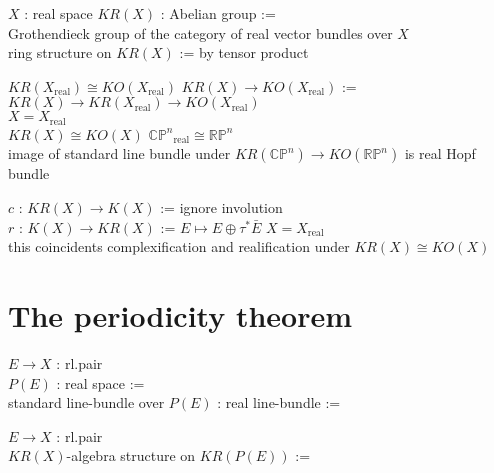 \documentclass[dvipdfmx]{jsarticle}
\begin{document}
\begin{Definition}
\itemwhen
  \For \(X\) : real space
\itemprop
  \Define \(KR(X)\) : Abelian group := \\
  Grothendieck group of the category of real vector bundles over \(X\) \\
  \Define ring structure on \(KR(X)\) := by tensor product
\end{Definition}

\begin{Theorem}
\itemprop
  \Then \(KR(X_{\text{real}}) \cong KO(X_{\text{real}})\)
\itemprop
  \Let \(KR(X) \to KO(X_{\text{real}})\) := \(KR(X) \to KR(X_{\text{real}}) \to KO(X_{\text{real}})\) \\
  \IfHold \(X = X_{\text{real}}\) \\
  \Then \(KR(X) \cong KO(X)\)
\itemprop
  \Then \({\mathbb{CP}^{n}}_{\text{real}} \cong \mathbb{RP}^{n}\) \\
  \Then image of standard line bundle under \(KR(\mathbb{CP}^{n}) \to KO(\mathbb{RP}^{n})\) is real Hopf bundle
\end{Theorem}

\begin{Definition}
\itemdefi
  \Define \(c\) : \(KR(X) \to K(X)\) := ignore involution \\
  \Define \(r\) : \(K(X) \to KR(X)\) := \(E \mapsto E \oplus \tau^{*} \bar{E}\)
\itemprop
  \IfHold \(X = X_{\text{real}}\) \\
  \Then this coincidents complexification and realification under \(KR(X) \cong KO(X)\)
\end{Definition}

\section*{The periodicity theorem}

\begin{Definition}
\itemdefi
  \For \(E \to X\) : rl.pair \\
  \Define \(P(E)\) : real space :=  \\
  \Define standard line-bundle over \(P(E)\) : real line-bundle := 
\end{Definition}

\begin{Definition}
\itemdefi
  \For \(E \to X\) : rl.pair \\
  \Define \(KR(X)\)-algebra structure on \(KR(P(E))\) := 
\end{Definition}
\end{document}
